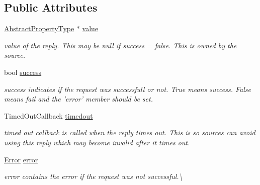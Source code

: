 \subsection*{Public Attributes}
\begin{DoxyCompactItemize}
\item 
\hypertarget{classAsyncPropertyReply_a133699682d0376614b08b162f81c2b02}{\hyperlink{classAbstractPropertyType}{Abstract\-Property\-Type} $\ast$ \hyperlink{classAsyncPropertyReply_a133699682d0376614b08b162f81c2b02}{value}}\label{classAsyncPropertyReply_a133699682d0376614b08b162f81c2b02}

\begin{DoxyCompactList}\small\item\em value of the reply. This may be null if success = false. This is owned by the source. \end{DoxyCompactList}\item 
\hypertarget{classAsyncPropertyReply_aed1f10990a65664ce0c630039cae01bb}{bool \hyperlink{classAsyncPropertyReply_aed1f10990a65664ce0c630039cae01bb}{success}}\label{classAsyncPropertyReply_aed1f10990a65664ce0c630039cae01bb}

\begin{DoxyCompactList}\small\item\em success indicates if the request was successfull or not. True means success. False means fail and the 'error' member should be set. \end{DoxyCompactList}\item 
\hypertarget{classAsyncPropertyReply_a64b8443702607f990ea36e6aaa16b0a5}{Timed\-Out\-Callback \hyperlink{classAsyncPropertyReply_a64b8443702607f990ea36e6aaa16b0a5}{timedout}}\label{classAsyncPropertyReply_a64b8443702607f990ea36e6aaa16b0a5}

\begin{DoxyCompactList}\small\item\em timed out callback is called when the reply times out. This is so sources can avoid using this reply which may become invalid after it times out. \end{DoxyCompactList}\item 
\hyperlink{classAsyncPropertyReply_ad91affaa25fcc3b73947a6cf4591e5d1}{Error} \hyperlink{classAsyncPropertyReply_a8c5cb98a6e2a72d6d94b43449a5e842d}{error}
\begin{DoxyCompactList}\small\item\em error contains the error if the request was not successful.\textbackslash{} \end{DoxyCompactList}\end{DoxyCompactItemize}


